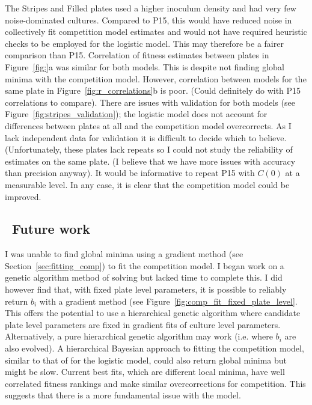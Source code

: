 The Stripes and Filled plates used a higher inoculum density and had
very few noise-dominated cultures. Compared to P15, this would have
reduced noise in collectively fit competition model estimates and
would not have required heuristic checks to be employed for the
logistic model. This may therefore be a fairer comparison than
P15. Correlation of fitness estimates between plates in
Figure~\ref{fig:}a was similar for both models. This is despite not
finding global minima with the competition model. However, correlation
between models for the same plate in Figure~\ref{fig:r_correlations}b
is poor. (Could definitely do with P15 correlations to compare). There
are issues with validation for both models (see
Figure~\ref{fig:stripes_validation}); the logistic model does not
account for differences between plates at all and the competition
model overcorrects. As I lack independent data for validation it is
difficult to decide which to believe. (Unfortunately, these plates
lack repeats so I could not study the reliability of estimates on the
same plate. (I believe that we have more issues with accuracy than
precision anyway). It would be informative to repeat P15 with
\(C(0)\) at a measurable level. In any case, it is clear that the
competition model could be improved.


\subsection{\thesubsection~Future work}

I was unable to find global minima using a gradient method (see
Section~\ref{sec:fitting_comp}) to fit the competition model. I began
work on a genetic algorithm method of solving but lacked time to
complete this. I did however find that, with fixed plate level
parameters, it is possible to reliably return \(b_{i}\) with a
gradient method (see Figure~\ref{fig:comp_fit_fixed_plate_level}. This
offers the potential to use a hierarchical genetic algorithm where
candidate plate level parameters are fixed in gradient fits of culture
level parameters. Alternatively, a pure hierarchical genetic algorithm
may work (i.e. where \(b_{i}\) are also evolved). A hierarchical
Bayesian approach to fitting the competition model, similar to that of
\citet{Heydari2016} for the logistic model, could also return global
minima but might be slow. Current best fits, which are different local
minima, have well correlated fitness rankings and make similar
overcorrections for competition. This suggests that there is a more
fundamental issue with the model.

